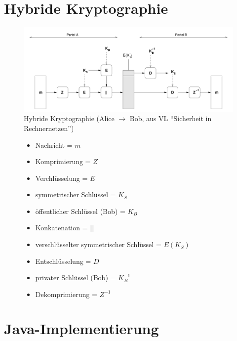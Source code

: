 \documentclass[10pt,a4paper]{article}
\begin{document}
\newpage
\section{Hybride Kryptographie}
\begin{figure}[hbtp]
\centering
\includegraphics[width=\textwidth]{hybrid.PNG}
\caption{Hybride Kryptographie (Alice $\rightarrow$ Bob, aus VL "`Sicherheit in Rechnernetzen"')}
\end{figure}

\begin{figure}[!ht]
\begin{minipage}[t]{0.45\linewidth}
\centering
\begin{itemize}
\item Nachricht = $m$
\item Komprimierung = $Z$
\item Verchlüsselung = $E$
\item symmetrischer Schlüssel = $K_S$
\item öffentlicher Schlüssel (Bob) = $K_B$
\end{itemize}
\end{minipage}
\hspace{0.5cm}
\begin{minipage}[t]{0.45\linewidth}
\centering
\begin{itemize}
\item Konkatenation = $||$
\item verschlüsselter symmetrischer Schlüssel = $E(K_S)$
\item Entschlüsselung = $D$
\item privater Schlüssel (Bob) = $K_B ^{-1}$
\item Dekomprimierung = $Z^{-1}$
\end{itemize}
\end{minipage}
\end{figure}

\section{Java-Implementierung}
\end{document}
